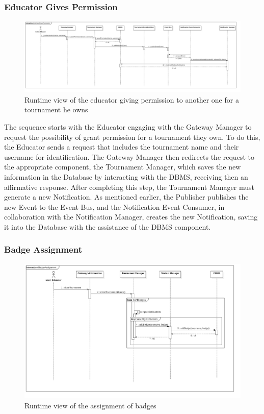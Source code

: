 \newpage

\subsubsection*{Educator Gives Permission}
\begin{figure}[h!]
    \centering
    \includegraphics[width=1.3\linewidth, angle=90]{2.ArchitecturalDesign/res/EducatorGivesPermission.jpg}
    \caption{Runtime view of the educator giving permission to another one for a tournament he owns}
    \label{fig:permission}
\end{figure}

The sequence starts with the Educator engaging with the Gateway Manager to request the possibility of grant permission for a tournament they own. To do this, the Educator sends a request that includes the tournament name and their username for identification.
The Gateway Manager then redirects the request to the appropriate component, the Tournament Manager, which saves the new information in the Database by interacting with the DBMS, receiving then an affirmative response.
After completing this step, the Tournament Manager must generate a new Notification. As mentioned earlier, the Publisher publishes the new Event to the Event Bus, and the Notification Event Consumer, in collaboration with the Notification Manager, creates the new Notification, saving it into the Database with the assistance of the DBMS component.

\newpage

\subsubsection*{Badge Assignment}
\begin{figure}[h!]
    \centering
    \includegraphics[width=1.3\linewidth, angle=90]{2.ArchitecturalDesign/res/BadgeAssignment.jpg}
    \caption{Runtime view of the assignment of badges}
    \label{fig:badge}
\end{figure}

